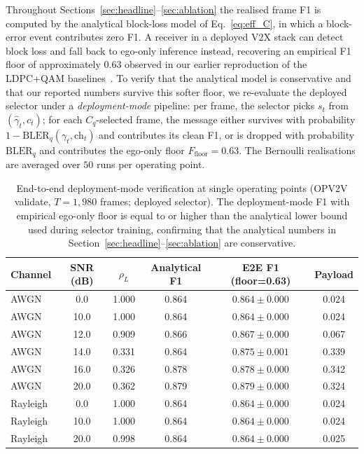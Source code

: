 \documentclass[journal]{IEEEtran}
\begin{document}
Throughout Sections~\ref{sec:headline}--\ref{sec:ablation} the realised
frame F1 is computed by the analytical block-loss model of
Eq.~\eqref{eq:eff_C}, in which a block-error event contributes zero F1.
A receiver in a deployed V2X stack can detect block loss and fall back
to ego-only inference instead, recovering an empirical F1 floor of
approximately $0.63$ observed in our earlier reproduction of the
LDPC+QAM baselines~\cite{sheng2024importance}. To verify that the
analytical model is conservative and that our reported numbers survive
this softer floor, we re-evaluate the deployed selector under a
\emph{deployment-mode} pipeline: per frame, the selector picks $s_t$
from $(\hat\gamma_t,c_t)$; for each $C_q$-selected frame, the message
either survives with probability $1-\mathrm{BLER}_q(\gamma_t,\text{ch}_t)$
and contributes its clean F1, or is dropped with probability
$\mathrm{BLER}_q$ and contributes the ego-only floor $F_{\mathrm{floor}}=0.63$.
The Bernoulli realisations are averaged over $50$ runs per operating point.

\begin{table}[t]
\centering
\caption{End-to-end deployment-mode verification at single operating points (OPV2V validate, $T=1{,}980$ frames; deployed selector). The deployment-mode F1 with empirical ego-only floor is equal to or higher than the analytical lower bound used during selector training, confirming that the analytical numbers in Section~\ref{sec:headline}--\ref{sec:ablation} are conservative.}
\label{tab:e2e}
\begin{tabular}{lccccc}
\toprule
Channel & SNR (dB) & $\rho_L$ & Analytical F1 & E2E F1 (floor=0.63) & Payload \\
\midrule
AWGN     & 0.0  & 1.000 & 0.864 & $0.864 \pm 0.000$ & 0.024 \\
AWGN     & 10.0 & 1.000 & 0.864 & $0.864 \pm 0.000$ & 0.024 \\
AWGN     & 12.0 & 0.909 & 0.866 & $0.867 \pm 0.000$ & 0.067 \\
AWGN     & 14.0 & 0.331 & 0.864 & $\mathbf{0.875 \pm 0.001}$ & 0.339 \\
AWGN     & 16.0 & 0.326 & 0.878 & $0.878 \pm 0.000$ & 0.342 \\
AWGN     & 20.0 & 0.362 & 0.879 & $0.879 \pm 0.000$ & 0.324 \\
Rayleigh & 0.0  & 1.000 & 0.864 & $0.864 \pm 0.000$ & 0.024 \\
Rayleigh & 10.0 & 1.000 & 0.864 & $0.864 \pm 0.000$ & 0.024 \\
Rayleigh & 20.0 & 0.998 & 0.864 & $0.864 \pm 0.000$ & 0.025 \\
\bottomrule
\end{tabular}
\end{table}
\end{document}
